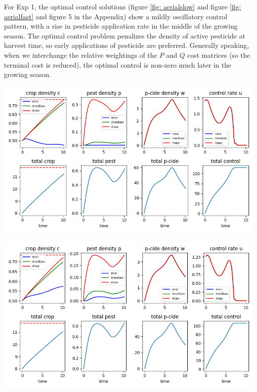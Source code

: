 \documentclass[11pt]{article}
\begin{document}
For Exp 1, the optimal control solutions (figure \ref{fig: aerialslow} and figure \ref{fig: aerialfast} and figure 5 in the Appendix) show a mildly oscillatory control pattern, with a rise in pesticide application rate in the middle of the growing season. The optimal control problem penalizes the density of active pesticide at harvest time, so early applications of pesticide are preferred. Generally speaking, when we interchange the relative weightings of the $P$ and $Q$ cost matrices (so the terminal cost is reduced), the optimal control is non-zero much later in the growing season.

\begin{minipage}{\textwidth}
	\begin{center}
		\includegraphics[width=0.8\linewidth]{../resim_240718-021040/time.png}
		\label{fig: aerialslow}
	\end{center}
\end{minipage}

\begin{minipage}{\textwidth}
	\begin{center}		
		\includegraphics[width=0.8\linewidth]{../resim_240718-005456/time.png}
		\label{fig: aerialfast}
	\end{center}
\end{minipage}
\end{document}
